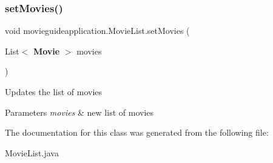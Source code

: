 \subsubsection{set\+Movies()}
{\footnotesize\ttfamily void movieguideapplication.\+Movie\+List.\+set\+Movies (\begin{DoxyParamCaption}\item[{List$<$ \textbf{ Movie} $>$}]{movies }\end{DoxyParamCaption})}

Updates the list of movies 
\begin{DoxyParams}{Parameters}
{\em movies} & new list of movies \\
\hline
\end{DoxyParams}


The documentation for this class was generated from the following file\+:\begin{DoxyCompactItemize}
\item 
Movie\+List.\+java\end{DoxyCompactItemize}
